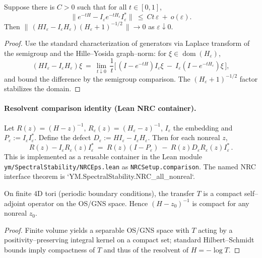\documentclass[11pt]{amsart}
\begin{document}
\begin{lemma}
Suppose there is $C>0$ such that for all $t\in[0,1]$,
\[
  \bigl\|e^{-tH}-I_{\varepsilon}e^{-tH_{\varepsilon}}I_{\varepsilon}^*\bigr\|\ \le\ C t\,\varepsilon\ +\ o(\varepsilon).
\]
Then $\|\,(H I_{\varepsilon}-I_{\varepsilon} H_{\varepsilon})(H_{\varepsilon}+1)^{-1/2}\,\|\to 0$ as $\varepsilon\downarrow 0$.
\end{lemma}

\begin{proof}
Use the standard characterization of generators via Laplace transform of the semigroup and the Hille–Yosida graph–norm: for $\xi\in\operatorname{dom}(H_{\varepsilon})$,
\[
  (H I_{\varepsilon}-I_{\varepsilon} H_{\varepsilon})\xi\ =\ \lim_{t\downarrow 0}\,\frac{1}{t}\bigl[\,(I-e^{-tH})I_{\varepsilon}\xi\ -\ I_{\varepsilon}(I-e^{-tH_{\varepsilon}})\xi\,\bigr],
\]
and bound the difference by the semigroup comparison. The $(H_{\varepsilon}+1)^{-1/2}$ factor stabilizes the domain.
\end{proof}

\paragraph{Resolvent comparison identity (Lean NRC container).}
Let $R(z)=(H-z)^{-1}$, $R_{\varepsilon}(z)=(H_{\varepsilon}-z)^{-1}$, $I_{\varepsilon}$ the embedding and $P_{\varepsilon}:=I_{\varepsilon}I_{\varepsilon}^*$. Define the defect $D_{\varepsilon}:=H I_{\varepsilon}-I_{\varepsilon}H_{\varepsilon}$. Then for each nonreal $z$,
\[
  R(z) - I_{\varepsilon} R_{\varepsilon}(z) I_{\varepsilon}^*
  \ =\ R(z)(I-P_{\varepsilon})\ -\ R(z) D_{\varepsilon} R_{\varepsilon}(z) I_{\varepsilon}^*\,.
\]
This is implemented as a reusable container in the Lean module
\texttt{ym/SpectralStability/NRCEps.lean} as \texttt{NRCSetup.comparison}. The named NRC interface theorem is `YM.SpectralStability.NRC_all_nonreal`.

\begin{lemma}
On finite 4D tori (periodic boundary conditions), the transfer $T$ is a compact self–adjoint operator on the OS/GNS space. Hence $(H-z_0)^{-1}$ is compact for any nonreal $z_0$.
\end{lemma}

\begin{proof}
Finite volume yields a separable OS/GNS space with $T$ acting by a positivity–preserving integral kernel on a compact set; standard Hilbert–Schmidt bounds imply compactness of $T$ and thus of the resolvent of $H=-\log T$.
\end{proof}
\end{document}
